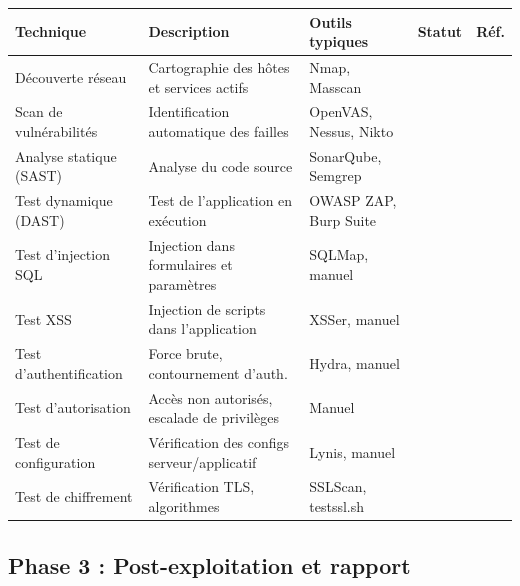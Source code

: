 \documentclass[12pt,a4paper,oneside]{report}
\begin{document}
\begin{longtable}{|p{3cm}|p{4cm}|p{4cm}|p{1.5cm}|p{1cm}|}
\hline
\rowcolor{theadcolor}
\color{white}\textbf{Technique} &
\color{white}\textbf{Description} &
\color{white}\textbf{Outils typiques} &
\color{white}\textbf{Statut} &
\color{white}\textbf{Réf.} \\
\hline\endhead\hline\endfoot
\rowcolor{trow1}
Découverte réseau &
  Cartographie des hôtes et services actifs &
  Nmap, Masscan & & \\
\hline\rowcolor{trow2}
Scan de vulnérabilités &
  Identification automatique des failles &
  OpenVAS, Nessus, Nikto & & \\
\hline\rowcolor{trow1}
Analyse statique (SAST) &
  Analyse du code source &
  SonarQube, Semgrep & & \\
\hline\rowcolor{trow2}
Test dynamique (DAST) &
  Test de l'application en exécution &
  OWASP ZAP, Burp Suite & & \\
\hline\rowcolor{trow1}
Test d'injection SQL &
  Injection dans formulaires et paramètres &
  SQLMap, manuel & & \\
\hline\rowcolor{trow2}
Test XSS &
  Injection de scripts dans l'application &
  XSSer, manuel & & \\
\hline\rowcolor{trow1}
Test d'authentification &
  Force brute, contournement d'auth. &
  Hydra, manuel & & \\
\hline\rowcolor{trow2}
Test d'autorisation &
  Accès non autorisés, escalade de privilèges &
  Manuel & & \\
\hline\rowcolor{trow1}
Test de configuration &
  Vérification des configs serveur/applicatif &
  Lynis, manuel & & \\
\hline\rowcolor{trow2}
Test de chiffrement &
  Vérification TLS, algorithmes &
  SSLScan, testssl.sh & & \\
\hline
\end{longtable}

\subsection*{Phase 3 : Post-exploitation et rapport}
\end{document}
